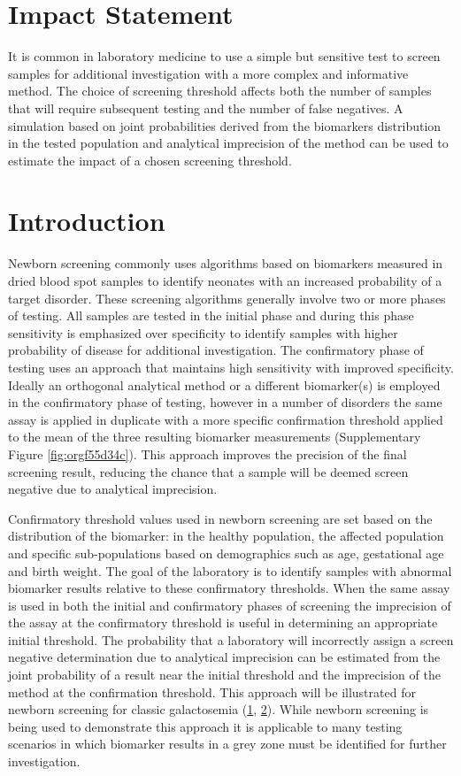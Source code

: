 \documentclass[review]{elsarticle}
\begin{document}
\section*{Impact Statement}
\label{sec:orgf7dde26}
It is common in laboratory medicine to use a simple but sensitive
test to screen samples for additional investigation with a more
complex and informative method. The choice of screening threshold
affects both the number of samples that will require subsequent
testing and the number of false negatives. A simulation based on
joint probabilities derived from the biomarkers distribution in the
tested population and analytical imprecision of the method can be
used to estimate the impact of a chosen screening threshold.

\section*{Introduction}
\label{sec:org23e7f2f}
Newborn screening commonly uses algorithms based on biomarkers
measured in dried blood spot samples to identify neonates with an
increased probability of a target disorder. These screening algorithms
generally involve two or more phases of testing. All samples are
tested in the initial phase and during this phase sensitivity is
emphasized over specificity to identify samples with higher
probability of disease for additional investigation. The confirmatory
phase of testing uses an approach that maintains high sensitivity
with improved specificity. Ideally an orthogonal analytical method or
a different biomarker(s) is employed in the confirmatory phase of
testing, however in a number of disorders the same assay is applied in
duplicate with a more specific confirmation threshold applied to the
mean of the three resulting biomarker measurements (Supplementary Figure
\ref{fig:orgf55d34c}). This approach improves the precision of the final
screening result, reducing the chance that a sample will be deemed
screen negative due to analytical imprecision.

Confirmatory threshold values used in newborn screening are set based
on the distribution of the biomarker: in the healthy population, the
affected population and specific sub-populations based on demographics
such as age, gestational age and birth weight. The goal of the
laboratory is to identify samples with abnormal biomarker results
relative to these confirmatory thresholds. When the same assay is used
in both the initial and confirmatory phases of screening the
imprecision of the assay at the confirmatory threshold is useful in
determining an appropriate initial threshold. The probability that a
laboratory will incorrectly assign a screen negative determination due
to analytical imprecision can be estimated from the joint probability
of a result near the initial threshold and the imprecision of the
method at the confirmation threshold. This approach will be
illustrated for newborn screening for classic galactosemia (\hyperlink{citeproc_bib_item_1}{1}, \hyperlink{citeproc_bib_item_2}{2}). While newborn screening is being
used to demonstrate this approach it is applicable to many testing
scenarios in which biomarker results in a grey zone must be identified
for further investigation.
\end{document}
